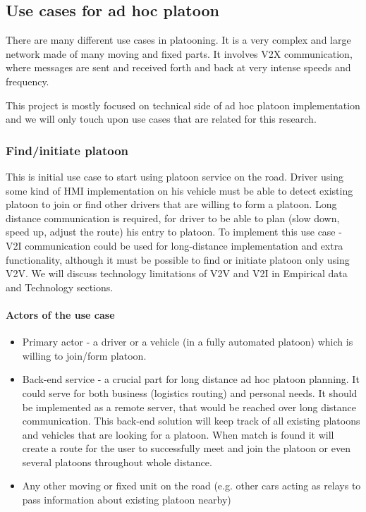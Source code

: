 \subsection{Use cases for ad hoc platoon}
% 
There are many different use cases in platooning. It is a very complex and large network made of many moving and fixed parts. It involves V2X communication, where messages are sent and received forth and back at very intense speeds and frequency.\par
%  
This project is mostly focused on technical side of ad hoc platoon implementation and we will only touch upon use cases that are related for this research.
% 
\subsubsection{Find/initiate platoon}
% 
This is initial use case to start using platoon service on the road. Driver using some kind of HMI implementation on his vehicle must be able to detect existing platoon to join or find other drivers that are willing to form a platoon. Long distance communication is required, for driver to be able to plan (slow down, speed up, adjust the route) his entry to platoon. To implement this use case - V2I communication could be used for long-distance implementation and extra functionality, although it must be possible to find or initiate platoon only using V2V. We will discuss technology limitations of V2V and V2I in Empirical data and Technology sections.
% 
\paragraph{Actors of the use case}
\begin{itemize}[noitemsep]
    \item Primary actor - a driver or a vehicle (in a fully automated platoon) which is willing to join/form platoon.
    \item Back-end service - a crucial part for long distance ad hoc platoon planning. It could serve for both business (logistics routing) and personal needs. It should be implemented as a remote server, that would be reached over long distance communication. This back-end solution will keep track of all existing platoons and vehicles that are looking for a platoon. When match is found it will create a route for the user to successfully meet and join the platoon or even several platoons throughout whole distance.
    \item Any other moving or fixed unit on the road (e.g. other cars acting as relays to pass information about existing platoon nearby)
\end{itemize}
% 
